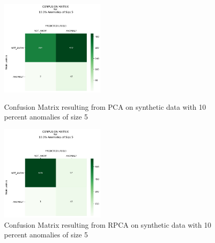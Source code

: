 \documentclass{article}
\begin{document}
\begin{figure}[H]
\begin{minipage}[b]{0.45\linewidth}
    \centering

    \includegraphics[width=50mm, scale=0.5]{cmPCATest_400AnomSize5.jpg}
    \caption{Confusion Matrix resulting from PCA on synthetic data with 10 percent anomalies of size 5}
    \label{fig::CMtrainPCA4005}
\end{minipage}
\quad
\begin{minipage}[b]{0.45\linewidth}
    \centering
    \includegraphics[width=50mm, scale=0.5]{cmRPCATest_400AnomSize5.jpg}
    \caption{Confusion Matrix resulting from RPCA on synthetic data with 10 percent anomalies of size 5}
    \label{fig::CMtrainRPCA4005}
\end{minipage}
\end{figure}

\end{document}
